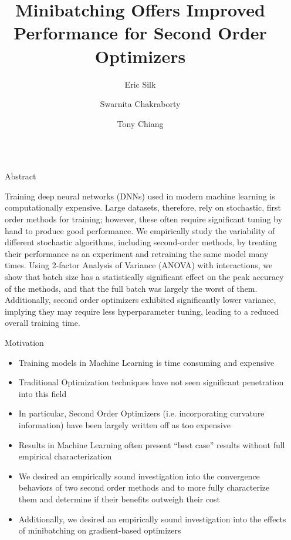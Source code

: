 \documentclass[final]{beamer}
\title{Minibatching Offers Improved Performance for Second Order Optimizers}
\author{Eric Silk \inst{1} \and Swarnita Chakraborty \inst{2} \and Tony Chiang \inst{3}}
\institute[shortinst]{
  \inst{1} University of Washington/University of Illinois Urbana-Champaign \samelineand
  \inst{2} Washington State University \samelineand
  \inst{3} Pacific Northwest National Laboratory
}
\newlength{\sepwidth}
\newlength{\colwidth}
\newcommand{\separatorcolumn}{\begin{column}{\sepwidth}\end{column}}
\begin{document}
\begin{frame}[t]
  \begin{columns}[t]
    \separatorcolumn

    \begin{column}{\colwidth}

      \begin{block}{Abstract}

        Training deep neural networks (DNNs) used in modern machine learning is computationally
        expensive. Large datasets, therefore, rely on stochastic, first order methods for training;
        however, these often require significant tuning by hand to produce good performance. We
        empirically study the variability of different stochastic algorithms, including second-order
        methods, by treating their performance as an experiment and retraining the same model many
        times. Using 2-factor Analysis of Variance (ANOVA) with interactions, we show that batch
        size has a statistically significant effect on the peak accuracy of the methods, and that
        the full batch was largely the worst of them. Additionally, second order optimizers
        exhibited significantly lower variance, implying they may require less hyperparameter
        tuning, leading to a reduced overall training time.

      \end{block}

      \begin{alertblock}{Motivation}
        \begin{itemize}
          \item Training models in Machine Learning is time consuming and expensive
          \item Traditional Optimization techniques have not seen significant penetration into this field
          \item In particular, Second Order Optimizers (i.e. incorporating curvature information)
                have been largely written off as too expensive
          \item Results in Machine Learning often present ``best case'' results without full
                empirical characterization
          \item We desired an empirically sound investigation into the convergence behaviors of two
                second order methods and to more fully characterize them and determine if their benefits
                outweigh their cost
          \item Additionally, we desired an empirically sound investigation into the effects of
                minibatching on gradient-based optimizers
        \end{itemize}


\end{alertblock}
\end{column}
\end{columns}
\end{frame}
\end{document}
